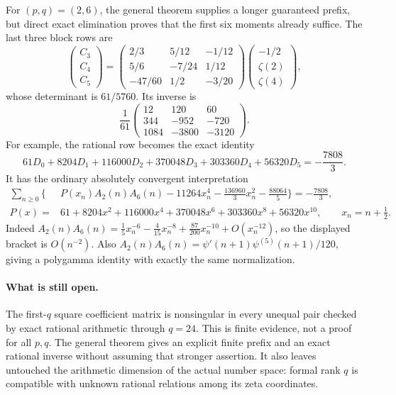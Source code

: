 \documentclass[11pt,a4paper]{article}
\numberwithin{equation}{section}
\theoremstyle{definition}
\newcommand{\C}{\mathbb C}
\begin{document}
For $(p,q)=(2,6)$, the general theorem supplies a longer guaranteed
prefix, but direct exact elimination proves that the first six moments
already suffice. The last three block rows are
\[
 \begin{pmatrix}C_3\\C_4\\C_5\end{pmatrix}
 =\begin{pmatrix}
  2/3&5/12&-1/12\\
  5/6&-7/24&1/12\\
  -47/60&1/2&-3/20
 \end{pmatrix}
 \begin{pmatrix}-1/2\\\zeta(2)\\\zeta(4)\end{pmatrix},
\]
whose determinant is $61/5760$. Its inverse is
\begin{equation}\label{tr:26inverse}
 \frac1{61}
 \begin{pmatrix}
 12&120&60\\344&-952&-720\\1084&-3800&-3120
 \end{pmatrix}.
\end{equation}
For example, the rational row becomes the exact identity
\begin{equation}\label{tr:26rational}
 61D_0+8204D_1+116000D_2+370048D_3
      +303360D_4+56320D_5=-\frac{7808}{3}.
\end{equation}
It has the ordinary absolutely convergent interpretation
\begin{equation}\label{tr:26ordinary}
 \begin{split}
 \sum_{n\ge0}\bigg\{&P(x_n)A_2(n)A_6(n)
   -11264x_n^4-\frac{136960}{3}x_n^2-\frac{88064}{5}\bigg\}
   =-\frac{7808}{3},\\
 P(x)={}&61+8204x^2+116000x^4+370048x^6
                +303360x^8+56320x^{10},\qquad x_n=n+\frac12.
 \end{split}
\end{equation}
Indeed $A_2(n)A_6(n)=\frac15x_n^{-6}
-\frac4{15}x_n^{-8}+\frac{87}{200}x_n^{-10}+O(x_n^{-12})$,
so the displayed bracket is $O(n^{-2})$. Also
$A_2(n)A_6(n)=\psi'(n+1)\psi^{(5)}(n+1)/120$, giving a
polygamma identity with exactly the same normalization.

\paragraph{What is still open.}
The first-$q$ square coefficient matrix is nonsingular in every
unequal pair checked by exact rational arithmetic through $q=24$.
This is finite evidence, not a proof for all $p,q$. The general
theorem gives an explicit finite prefix and an exact rational inverse
without assuming that stronger assertion. It also leaves untouched
the arithmetic dimension of the actual number space: formal rank $q$
is compatible with unknown rational relations among its zeta coordinates.
\end{document}
